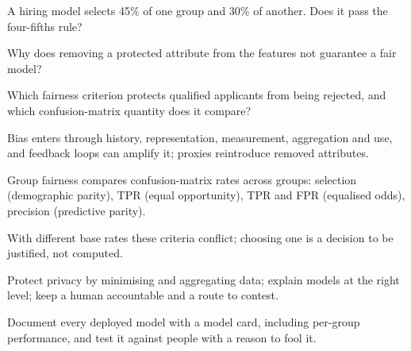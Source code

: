 \begin{checkpoint}
\begin{tightnum}
  \item A hiring model selects 45\% of one group and 30\% of another. Does it pass the
        four-fifths rule?
  \item Why does removing a protected attribute from the features not guarantee a fair
        model?
  \item Which fairness criterion protects qualified applicants from being rejected,
        and which confusion-matrix quantity does it compare?
\end{tightnum}
\end{checkpoint}

\begin{chaptersummary}
\begin{tight}
  \item Bias enters through history, representation, measurement, aggregation and
        use, and feedback loops can amplify it; proxies reintroduce removed
        attributes.
  \item Group fairness compares confusion-matrix rates across groups: selection
        (demographic parity), TPR (equal opportunity), TPR and FPR (equalised odds),
        precision (predictive parity).
  \item With different base rates these criteria conflict; choosing one is a
        decision to be justified, not computed.
  \item Protect privacy by minimising and aggregating data; explain models at the
        right level; keep a human accountable and a route to contest.
  \item Document every deployed model with a model card, including per-group
        performance, and test it against people with a reason to fool it.
\end{tight}
\end{chaptersummary}

